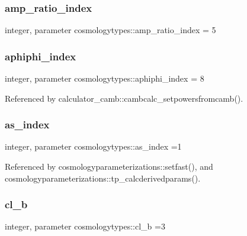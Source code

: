 \subsubsection{\texorpdfstring{amp\+\_\+ratio\+\_\+index}{amp\_ratio\_index}}
{\footnotesize\ttfamily integer, parameter cosmologytypes\+::amp\+\_\+ratio\+\_\+index = 5}

\mbox{\label{namespacecosmologytypes_a702869d17ac6c53907a307832df04f5b}} 
\subsubsection{\texorpdfstring{aphiphi\+\_\+index}{aphiphi\_index}}
{\footnotesize\ttfamily integer, parameter cosmologytypes\+::aphiphi\+\_\+index = 8}



Referenced by calculator\+\_\+camb\+::cambcalc\+\_\+setpowersfromcamb().

\mbox{\label{namespacecosmologytypes_a46466f5670050f4167e8e9fbe5416298}} 
\subsubsection{\texorpdfstring{as\+\_\+index}{as\_index}}
{\footnotesize\ttfamily integer, parameter cosmologytypes\+::as\+\_\+index =1}



Referenced by cosmologyparameterizations\+::setfast(), and cosmologyparameterizations\+::tp\+\_\+calcderivedparams().

\mbox{\label{namespacecosmologytypes_a59dfbed9693b76beb42a0c48ec80b388}} 
\subsubsection{\texorpdfstring{cl\+\_\+b}{cl\_b}}
{\footnotesize\ttfamily integer, parameter cosmologytypes\+::cl\+\_\+b =3}



